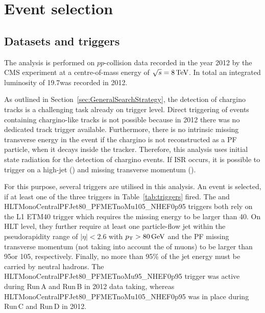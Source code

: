 \FloatBarrier
\chapter{Event selection}
\label{sec:EventSelection}
\section{Datasets and triggers}
\label{sec:DatasetsAndTriggers}

The analysis is performed on $pp$-collision data recorded in the year 2012 by the CMS experiment at a centre-of-mass energy of $\sqrt{s}=8\,\text{Te}\kern-0.06667em\text{V}$.
In total an integrated luminosity of 19.7\fbinv was recorded in 2012.

As outlined in Section~\ref{sec:GeneralSearchStrategy}, the detection of chargino tracks is a challenging task already on trigger level.
Direct triggering of events containing chargino-like tracks is not possible because in 2012 there was no dedicated track trigger available.
Furthermore, there is no intrinsic missing transverse energy in the event if the chargino is not reconstructed as a PF particle, \eg when it decays inside the tracker.
Therefore, this analysis uses initial state radiation for the detection of chargino events.
If ISR occurs, it is possible to trigger on a high-\pt jet (\ptfirstjet) and missing transverse momentum (\met).

For this purpose, several triggers are utilised in this analysis.
An event is selected, if at least one of the three triggers in Table~\ref{tab:triggers} fired.
The  and HLTMonoCentralPFJet80\_PFMETnoMu105\_NHEF0p95 triggers both rely on the L1 ETM40 trigger which requires the missing energy to be larger than 40\gev.
On HLT level, they further require at least one particle-flow jet within the pseudorapidity range of $|\eta|<2.6$ with $p_{\text{T}}>80\,\text{Ge}\kern-0.06667em\text{V}$ and the PF missing transverse momentum (not taking into account the \pt of muons) to be larger than 95\gev or 105\gev, respectively.
Finally, no more than 95\% of the jet energy must be carried by neutral hadrons.
The HLTMonoCentralPFJet80\_PFMETnoMu95\_NHEF0p95 trigger was active during Run\,A and Run\,B in 2012 data taking, whereas HLTMonoCentralPFJet80\_PFMETnoMu105\_NHEF0p95 was in place during Run\,C and Run\,D in 2012.

